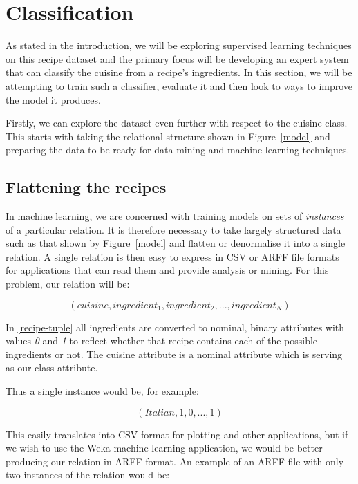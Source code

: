 \documentclass[11pt,a4paper]{article}
\begin{document}
\section{Classification}

As stated in the introduction, we will be exploring supervised learning techniques
on this recipe dataset and the primary focus will be developing an expert system
that can classify the cuisine from a recipe's ingredients. In this section,
we will be attempting to train such a classifier, evaluate it and then
look to ways to improve the model it produces.

Firstly, we can explore the dataset even further with respect to the cuisine class.
This starts with taking the relational structure shown in Figure~\ref{model} and
preparing the data to be ready for data mining and machine learning techniques.

\subsection{Flattening the recipes}

In machine learning, we are concerned with training models on sets of \emph{instances}
of a particular relation. It is therefore necessary to take largely structured
data such as that shown by Figure~\ref{model} and flatten or denormalise it into
a single relation. A single relation is then easy to express in CSV or ARFF file
formats for applications that can read them and provide analysis or mining. For this
problem, our relation will be:

\begin{equation} \label{recipe-tuple}
(cuisine, ingredient_1, ingredient_2, ... ,ingredient_N)
\end{equation}

In \eqref{recipe-tuple} all ingredients are converted to nominal, binary attributes
with values \emph{0} and \emph{1} to reflect whether that recipe contains
each of the possible ingredients or not. The cuisine attribute is a nominal
attribute which is serving as our class attribute.

Thus a single instance would be, for example:

\begin{equation} \label{recipe-example}
(Italian,1,0,...,1)
\end{equation}

This easily translates into CSV format for plotting and other applications, but if
we wish to use the Weka machine learning application, we would be better producing
our relation in ARFF format. \cite{witten2011data} An example of an ARFF file with only two
instances of the relation would be:
\end{document}
